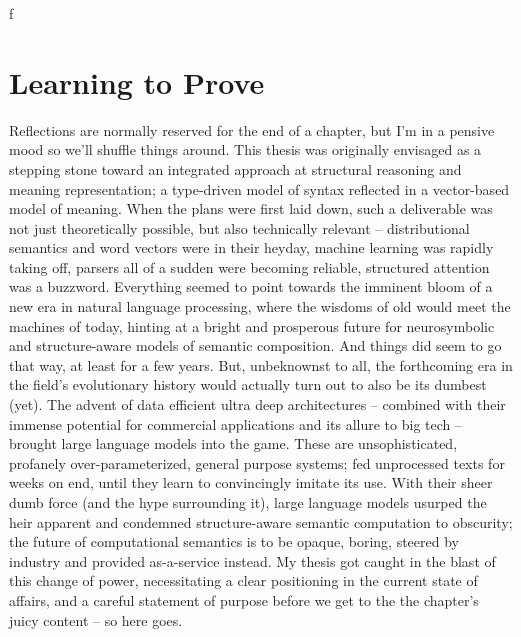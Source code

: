 f\chapter{Learning to Prove}
\label{chapter:chapter_4}




Reflections are normally reserved for the end of a chapter, but I'm in a pensive mood so we'll shuffle things around.
This thesis was originally envisaged as a stepping stone toward an integrated approach at structural reasoning and meaning representation; a type-driven model of syntax reflected in a vector-based model of meaning.
When the plans were first laid down, such a deliverable was not just theoretically possible, but also technically relevant -- distributional semantics and word vectors were in their heyday, machine learning was rapidly taking off, parsers all of a sudden were becoming reliable, structured attention was a buzzword.
Everything seemed to point towards the imminent bloom of a new era in natural language processing, where the wisdoms of old would meet the machines of today, hinting at a bright and prosperous future for neurosymbolic and structure-aware models of semantic composition.
And things did seem to go that way, at least for a few years.
But, unbeknownst to all, the forthcoming era in the field's evolutionary history would actually turn out to also be its dumbest (yet).
The advent of data efficient ultra deep architectures -- combined with their immense potential for commercial applications and its allure to big tech -- brought large language models into the game.
These are unsophisticated, profanely over-parameterized, general purpose systems; fed unprocessed texts for weeks on end, until they learn to convincingly imitate its use.
With their sheer dumb force (and the hype surrounding it), large language models usurped the heir apparent and condemned structure-aware semantic computation to obscurity; the future of computational semantics is to be opaque, boring, steered by industry and provided as-a-service instead.
My thesis got caught in the blast of this change of power, necessitating a clear positioning in the current state of affairs, and a careful statement of purpose before we get to the the chapter's juicy content -- so here goes.

